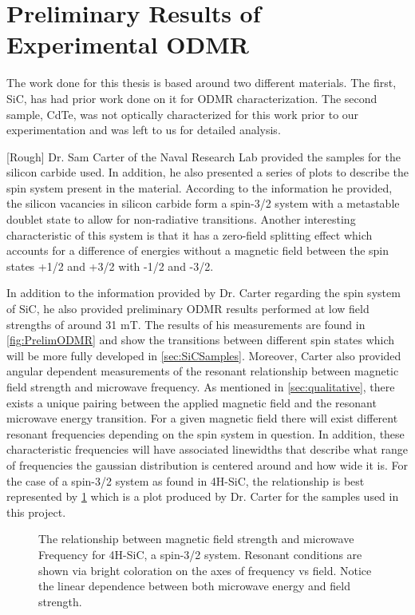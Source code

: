 \documentclass[oneside, astronomy, noacknowlegments]{BYUPhys}
\begin{document}
\section{Preliminary Results of Experimental ODMR}

The work done for this thesis is based around two different materials. The first, SiC, has had prior work done on it for ODMR characterization. The second sample, CdTe, was not optically characterized for this work prior to our experimentation and was left to us for detailed analysis.

[Rough] Dr. Sam Carter of the Naval Research Lab provided the samples for the silicon carbide used. In addition, he also presented a series of plots to describe the spin system present in the material. According to the information he provided, the silicon vacancies in silicon carbide form a spin-3/2 system with a metastable doublet state to allow for non-radiative transitions. Another interesting characteristic of this system is that it has a zero-field splitting effect which accounts for a difference of energies without a magnetic field between the spin states +1/2 and +3/2 with -1/2 and -3/2.

In addition to the information provided by Dr. Carter regarding the spin system of SiC, he also provided preliminary ODMR results performed at low field strengths of around 31 mT. The results of his measurements are found in \ref{fig:PrelimODMR} and show the transitions between different spin states which will be more fully developed in \ref{sec:SiCSamples}. Moreover, Carter also provided angular dependent measurements of the resonant relationship between magnetic field strength and microwave frequency. As mentioned in \ref{sec:qualitative}, there exists a unique pairing between the applied magnetic field and the resonant microwave energy transition. For a given magnetic field there will exist different resonant frequencies depending on the spin system in question. In addition, these characteristic frequencies will have associated linewidths that describe what range of frequencies the gaussian distribution is centered around and how wide it is. For the case of a spin-3/2 system as found in 4H-SiC, the relationship is best represented by \ref{fig:MFRelationship} which is a plot produced by Dr. Carter for the samples used in this project.

\begin{figure}
    \caption[Magnetic field and microwave frequency relationship]{\label{fig:MFRelationship}
     The relationship between magnetic field strength and microwave Frequency for 4H-SiC, a spin-3/2 system. Resonant conditions are shown via bright coloration on the axes of frequency vs field. Notice the linear dependence between both microwave energy and field strength.}
 \end{figure}
 
\end{document}
